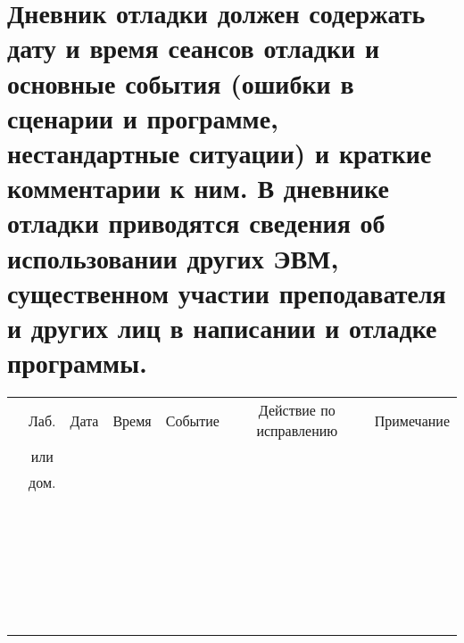 \section{Дневник отладки \textnormal{\small должен содержать дату и время сеансов отладки и основные события (ошибки в сценарии и программе, нестандартные ситуации) и краткие комментарии к ним. В дневнике отладки приводятся сведения об использовании других ЭВМ, существенном участии преподавателя и других лиц в написании и отладке программы.}} \hfill

\begin{table}[!h]
  \begin{tabular}{|c|c|c|c|c|c|c|}
    \hline
    \textnumero{} & Лаб. & Дата & Время & \hspace{1cm} Событие \hspace{1cm} &\quad Действие по исправлению \quad & \hspace{1cm} Примечание \hspace{1cm} \\
                  & или & & & & & \\
                  & дом. & & & & & \\
    \hline
                  & & & & & & \\
                  & & & & & & \\
                  & & & & & & \\
                  & & & & & & \\
                  & & & & & & \\
                  & & & & & & \\
                  & & & & & & \\
                  & & & & & & \\
                  & & & & & & \\
                  & & & & & & \\
                  & & & & & & \\
                  & & & & & & \\
                  & & & & & & \\
                  & & & & & & \\
                  & & & & & & \\
                  & & & & & & \\
                  & & & & & & \\
                  & & & & & & \\
                  & & & & & & \\
                  & & & & & & \\
                  & & & & & & \\
                  & & & & & & \\
                  & & & & & & \\
                  & & & & & & \\
                  & & & & & & \\
                  & & & & & & \\
    \hline
  \end{tabular}
\end{table}

